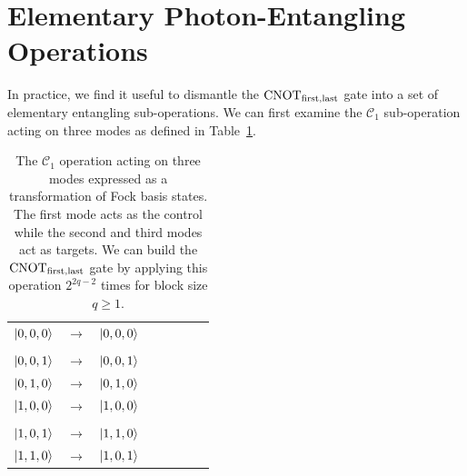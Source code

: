 \documentclass[aps,pra,twocolumn,superscriptaddress,floatfix,10pt]{revtex4}
\begin{document}
\section{Elementary Photon-Entangling Operations}
\label{Section Elementary Photon Entangling Operations}

 In practice, we find it useful to dismantle the $\mbox{CNOT}_{\rm first,last}$ gate into a set of elementary entangling sub-operations. We can first examine the $\mathcal{C}_1$ sub-operation acting on three modes as defined in Table~\ref{One Control Two Targets}. 
\begin {table}[h]
\begin{center}
	\begin{tabular}{l*{6}{c}r} 
		$\ket{0,0,0}$  &  $\rightarrow$ & $\ket{0,0,0}$ \\ \\
		$\ket{0,0,1}$  & $\rightarrow$ & $\ket{0,0,1}$ \\
		$\ket{0,1,0}$ & $\rightarrow$ & $\ket{0,1,0}$ \\
		$\ket{1,0,0}$ & $\rightarrow$ & $\ket{1,0,0} $ \\ \\
		$\ket{1,0,1}$ & $\rightarrow$ & $\ket{1,1,0}$ \\
		$\ket{1,1,0}$ & $\rightarrow$ & $\ket{1,0,1}$ \\
	\end{tabular}
	\caption{ \label{One Control Two Targets} The $\mathcal{C}_1$  operation acting on three modes expressed as a transformation of Fock basis states. The first mode acts as the control while the second and third modes act as targets. We can build the $\mbox{CNOT}_{\rm first,last}$ gate by applying this operation $2^{2 q -2}$ times for block size $q \ge 1 $.}
\end{center}
\end{table}
\end{document}
